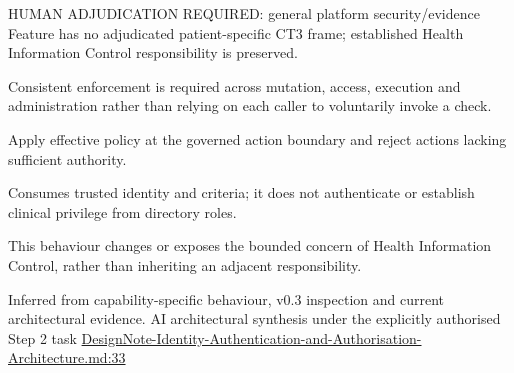HUMAN ADJUDICATION REQUIRED: general platform security/\allowbreak{}evidence Feature has no adjudicated patient-specific CT3 frame; established Health Information Control responsibility is preserved.



Consistent enforcement is required across mutation, access, execution and administration rather than relying on each caller to voluntarily invoke a check.



Apply effective policy at the governed action boundary and reject actions lacking sufficient authority.



Consumes trusted identity and criteria; it does not authenticate or establish clinical privilege from directory roles.



This behaviour changes or exposes the bounded concern of Health Information Control, rather than inheriting an adjacent responsibility.


Inferred from capability-specific behaviour, v0.3 inspection and current architectural evidence. AI architectural synthesis under the explicitly authorised Step 2 task \hyperref[evidence:13afd583ac468df7]{DesignNote-Identity-Authentication-and-Authorisation-Architecture.md:33}
